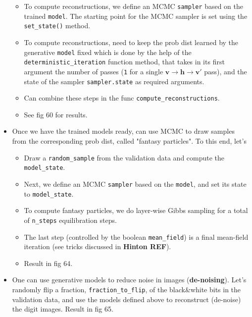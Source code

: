 \documentclass[norsk,a4paper,11pt]{article}
\begin{document}
\begin{itemize}
\begin{itemize}
		\item To compute reconstructions, we define an MCMC \texttt{sampler} based on the trained \texttt{model}. The starting point for the MCMC sampler is set using the \texttt{set\_state()} method.
		\item To compute reconstructions, need to keep the prob dist learned by the generative \texttt{model} fixed which is done by the help of the \texttt{deterministic\_iteration} function method, that  takes in its first argument the number of passes (\texttt{1} for a single $\bm{v}\rightarrow \bm{h} \rightarrow \bm{v}'$ pass), and the state of the sampler \texttt{sampler.state} as required arguments. 
		\item Can combine these steps in the func \texttt{compute\_reconstructions}.
		\item See fig 60 for results.
	\end{itemize}
	\item Once we have the trained models ready, can use MCMC to draw samples from the corresponding prob dist, called "fantasy particles". To this end, let's
	\begin{itemize}
		\item Draw a \texttt{random\_sample} from the validation data and compute the \texttt{model\_state}. 
		\item Next, we define an MCMC \texttt{sampler} based on the \texttt{model}, and set its state to \texttt{model\_state}.
		\item To compute fantasy particles, we do layer-wise Gibbs sampling for a total of \texttt{n\_steps} equilibration steps.
		\item The last step (controlled by the boolean \texttt{mean\_field}) is a final mean-field iteration (see tricks discussed in \textbf{Hinton REF}).
		\item Result in fig 64.
	\end{itemize}
	\item One can use generative models to reduce noise in images (\textbf{de-noising}). Let's randomly flip a fraction, \texttt{fraction\_to\_flip}, of the black\&white bits in the validation data, and use the models defined above to reconstruct (de-noise) the digit images. Result in fig 65.
\end{itemize}
\end{document}
